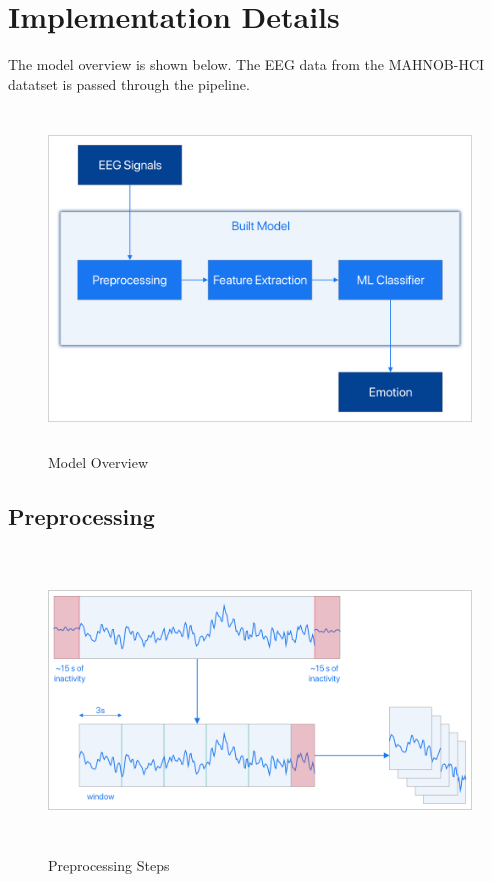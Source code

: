 
\chapter{Implementation Details} %

\label{Chapter5} %


The model overview is shown below. The EEG data from the MAHNOB-HCI datatset is passed through the pipeline.

\begin{figure}[H]
\centering
\includegraphics[height=9cm]{Figures/built_model.png}
\caption{Model Overview}
\label{fig22}
\end{figure}

\section{Preprocessing}

\begin{figure}[H]
\hspace*{-0.7cm}
\includegraphics[height=8cm]{Figures/preprocess.png}
\caption{Preprocessing Steps}
\label{fig23}
\end{figure}

